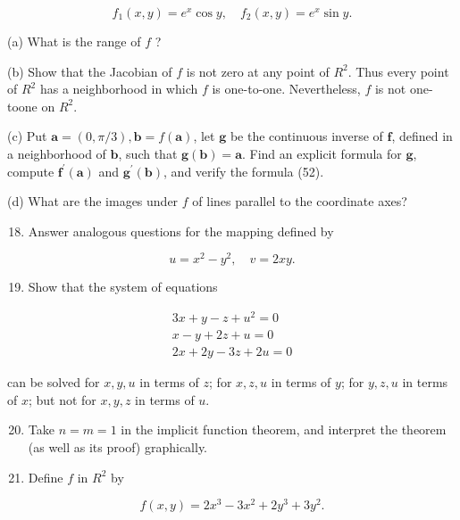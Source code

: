 \documentclass[10pt]{article}
\begin{document}
$$
f_{1}(x, y)=e^{x} \cos y, \quad f_{2}(x, y)=e^{x} \sin y .
$$

(a) What is the range of $f$ ?

(b) Show that the Jacobian of $f$ is not zero at any point of $R^{2}$. Thus every point of $R^{2}$ has a neighborhood in which $f$ is one-to-one. Nevertheless, $f$ is not one-toone on $R^{2}$.

(c) Put $\mathbf{a}=(0, \pi / 3), \mathbf{b}=f(\mathbf{a})$, let $\mathbf{g}$ be the continuous inverse of $\mathbf{f}$, defined in a neighborhood of $\mathbf{b}$, such that $\mathbf{g}(\mathbf{b})=\mathbf{a}$. Find an explicit formula for $\mathbf{g}$, compute $\mathbf{f}^{\prime}(\mathbf{a})$ and $\mathbf{g}^{\prime}(\mathbf{b})$, and verify the formula (52).

(d) What are the images under $f$ of lines parallel to the coordinate axes?

\begin{enumerate}
  \setcounter{enumi}{17}
  \item Answer analogous questions for the mapping defined by
\end{enumerate}

$$
u=x^{2}-y^{2}, \quad v=2 x y .
$$

\begin{enumerate}
  \setcounter{enumi}{18}
  \item Show that the system of equations
\end{enumerate}

$$
\begin{array}{r}
3 x+y-z+u^{2}=0 \\
x-y+2 z+u=0 \\
2 x+2 y-3 z+2 u=0
\end{array}
$$

can be solved for $x, y, u$ in terms of $z$; for $x, z, u$ in terms of $y$; for $y, z, u$ in terms of $x$; but not for $x, y, z$ in terms of $u$.

\begin{enumerate}
  \setcounter{enumi}{19}
  \item Take $n=m=1$ in the implicit function theorem, and interpret the theorem (as well as its proof) graphically.

  \item Define $f$ in $R^{2}$ by

\end{enumerate}

$$
f(x, y)=2 x^{3}-3 x^{2}+2 y^{3}+3 y^{2} .
$$
\end{document}

